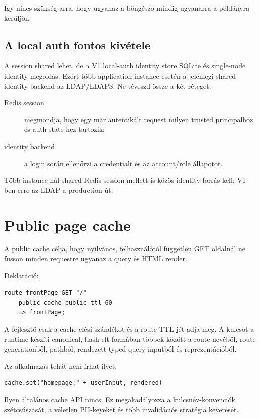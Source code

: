Így nincs szükség arra, hogy ugyanaz a böngésző mindig ugyanarra a példányra kerüljön.

\subsection*{A local auth fontos kivétele}

A session shared lehet, de a V1 local-auth identity store SQLite és single-node identity megoldás. Ezért több application instance esetén a jelenlegi shared identity backend az LDAP/LDAPS. Ne téveszd össze a két réteget:

\begin{description}
  \item[Redis session] megmondja, hogy egy már autentikált request milyen trusted principalhoz és auth state-hez tartozik;
  \item[identity backend] a login során ellenőrzi a credentialt és az account/role állapotot.
\end{description}

Több instance-nál shared Redis session mellett is közös identity forrás kell; V1-ben erre az LDAP a production út.

\section{Public page cache}

A public cache célja, hogy nyilvános, felhasználótól független GET oldalnál ne fusson minden requestre ugyanaz a query és HTML render.

Deklaráció:

\begin{lstlisting}[language=Velran]
route frontPage GET "/"
    public cache public ttl 60
    => frontPage;
\end{lstlisting}

A fejlesztő csak a cache-elési szándékot és a route TTL-jét adja meg. A kulcsot a runtime készíti canonical, hash-elt formában többek között a route nevéből, route generationből, pathból, rendezett typed query inputból és reprezentációból.

Az alkalmazás tehát nem írhat ilyet:

\begin{lstlisting}
cache.set("homepage:" + userInput, rendered)
\end{lstlisting}

Ilyen általános cache API nincs. Ez megakadályozza a kulcsnév-konvenciók szétcsúszását, a véletlen PII-keyeket és több invalidációs stratégia keverését.

